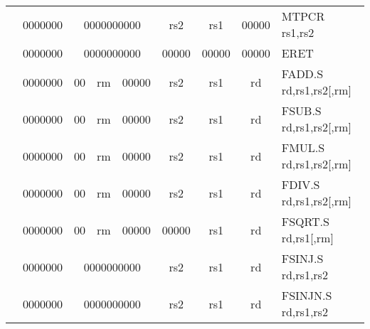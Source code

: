 \begin{table}[p]
\begin{small}
\begin{center}
\begin{tabular}{rcccccccccl}
&
\multicolumn{1}{|c|}{0000000} &
\multicolumn{5}{c|}{0000000000} &
\multicolumn{1}{c|}{rs2} &
\multicolumn{1}{c|}{rs1} &
\multicolumn{1}{c|}{00000} & MTPCR rs1,rs2 \\
\cline{2-10}
  

&
\multicolumn{1}{|c|}{0000000} &
\multicolumn{5}{c|}{0000000000} &
\multicolumn{1}{c|}{00000} &
\multicolumn{1}{c|}{00000} &
\multicolumn{1}{c|}{00000} & ERET  \\
\cline{2-10}
  

&
\multicolumn{1}{|c|}{0000000} &
\multicolumn{1}{c|}{00} &
\multicolumn{2}{c|}{rm} &
\multicolumn{2}{c|}{00000} &
\multicolumn{1}{c|}{rs2} &
\multicolumn{1}{c|}{rs1} &
\multicolumn{1}{c|}{rd} & FADD.S rd,rs1,rs2[,rm] \\
\cline{2-10}
  

&
\multicolumn{1}{|c|}{0000000} &
\multicolumn{1}{c|}{00} &
\multicolumn{2}{c|}{rm} &
\multicolumn{2}{c|}{00000} &
\multicolumn{1}{c|}{rs2} &
\multicolumn{1}{c|}{rs1} &
\multicolumn{1}{c|}{rd} & FSUB.S rd,rs1,rs2[,rm] \\
\cline{2-10}
  

&
\multicolumn{1}{|c|}{0000000} &
\multicolumn{1}{c|}{00} &
\multicolumn{2}{c|}{rm} &
\multicolumn{2}{c|}{00000} &
\multicolumn{1}{c|}{rs2} &
\multicolumn{1}{c|}{rs1} &
\multicolumn{1}{c|}{rd} & FMUL.S rd,rs1,rs2[,rm] \\
\cline{2-10}
  

&
\multicolumn{1}{|c|}{0000000} &
\multicolumn{1}{c|}{00} &
\multicolumn{2}{c|}{rm} &
\multicolumn{2}{c|}{00000} &
\multicolumn{1}{c|}{rs2} &
\multicolumn{1}{c|}{rs1} &
\multicolumn{1}{c|}{rd} & FDIV.S rd,rs1,rs2[,rm] \\
\cline{2-10}
  

&
\multicolumn{1}{|c|}{0000000} &
\multicolumn{1}{c|}{00} &
\multicolumn{2}{c|}{rm} &
\multicolumn{2}{c|}{00000} &
\multicolumn{1}{c|}{00000} &
\multicolumn{1}{c|}{rs1} &
\multicolumn{1}{c|}{rd} & FSQRT.S rd,rs1[,rm] \\
\cline{2-10}
  

&
\multicolumn{1}{|c|}{0000000} &
\multicolumn{5}{c|}{0000000000} &
\multicolumn{1}{c|}{rs2} &
\multicolumn{1}{c|}{rs1} &
\multicolumn{1}{c|}{rd} & FSINJ.S rd,rs1,rs2 \\
\cline{2-10}
  

&
\multicolumn{1}{|c|}{0000000} &
\multicolumn{5}{c|}{0000000000} &
\multicolumn{1}{c|}{rs2} &
\multicolumn{1}{c|}{rs1} &
\multicolumn{1}{c|}{rd} & FSINJN.S rd,rs1,rs2 \\
\cline{2-10}
  


\end{tabular}
\end{center}
\end{small}
\end{table}
